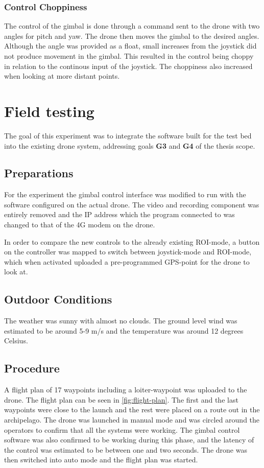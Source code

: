 \documentclass[nofilelist]{cslthse-msc}
\begin{document}
\subsubsection{Control Choppiness}
\label{sec:control-choppiness}
The control of the gimbal is done through a command sent to the drone with two angles for pitch and yaw. The drone then moves the gimbal to the desired angles. Although the angle was provided as a float, small increases from the joystick did not produce movement in the gimbal. This resulted in the control being choppy in relation to the continous input of the joystick. The choppiness also increased when looking at more distant points. 

\section{Field testing}
The goal of this experiment was to integrate the software built for the test bed into the existing drone system, addressing goals \textbf{G3} and \textbf{G4} of the thesis scope. 

\subsection{Preparations}
For the experiment the gimbal control interface was modified to run with the software configured on the actual drone. The video and recording component was entirely removed and the IP address which the program connected to was changed to that of the 4G modem on the drone.

In order to compare the new controls to the already existing ROI-mode, a button on the controller was mapped to switch between joystick-mode and ROI-mode, which when activated uploaded a pre-programmed GPS-point for the drone to look at.

\subsection{Outdoor Conditions}
The weather was sunny with almost no clouds. The ground level wind was estimated to be around 5-9 m/s and the temperature was around 12 degrees Celsius.

\subsection{Procedure}
A flight plan of 17 waypoints including a loiter-waypoint was uploaded to the drone. The flight plan can be seen in \ref{fig:flight-plan}. The first and the last waypoints were close to the launch and the rest were placed on a route out in the archipelago. The drone was launched in manual mode and was circled around the operators to confirm that all the systems were working. The gimbal control software was also confirmed to be working during this phase, and the latency of the control was estimated to be between one and two seconds. The drone was then switched into auto mode and the flight plan was started.
\end{document}
